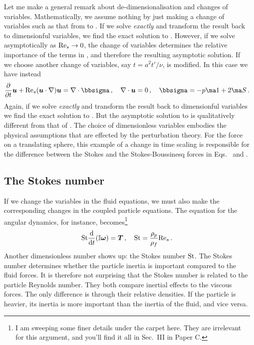 \documentclass[thesis.tex]{subfiles}
\begin{document}
Let me make a general remark about de-dimensionalisation and changes of variables. Mathematically, we assume nothing by just making a change of variables such as that from  to . If we solve  \emph{exactly} and transform the result back to dimensionful variables, we find the exact solution to . However, if we solve  asymptotically as $\textrm{Re}_s\to0$, the change of variables determines the relative importance of the terms in , and therefore the resulting asymptotic solution. If we choose another change of variables, say $t = a^2t'/\nu$,  is modified. In this case we have instead
\begin{align}
\pdiff{}{t}\ve u + \Reys(\ve u \cdot \nabla) \ve u=\nabla \cdot \bbsigma\,,\quad \nabla \cdot \ve u = 0\,,\quad \bbsigma = -p \ma 1 + 2\ma S\,.\eqnlab{nsintrodimless2}
\end{align}
Again, if we solve  \emph{exactly} and transform the result back to dimensionful variables we find the exact solution to . But the asymptotic solution to  is qualitatively different from that of . The choice of dimensionless variables embodies the physical assumptions that are effected by the perturbation theory. For the force on a translating sphere, this example of a change in time scaling is responsible for the difference between the Stokes and the Stokes-Boussinesq forces in Eqs.~ and .

\subsection{The Stokes number}\label{sec:stokesnumber}
If we change the variables in the fluid equations, we must also make the corresponding changes in the coupled particle equations. The equation for the angular dynamics, for instance, becomes\footnote{I am sweeping some finer details under the carpet here. They are irrelevant for this argument, and you'll find it all in Sec.~III in Paper C.}
\begin{align}
	\mbox{St}\frac{\mathrm{d} }{\mathrm{d} t}(\mathbb{I} \mbox{\boldmath$\omega$}) = \mbox{\boldmath$T$}\,,\quad  \mbox{St}= \frac{\rho_p}{\rho_f}\textrm{Re}_s\,.
\end{align}
Another dimensionless number shows up: the Stokes number $\mbox{St}$. The Stokes number determines whether the particle inertia is important compared to the fluid forces. It is therefore not surprising that the Stokes number is related to the particle Reynolds number. They both compare inertial effects to the viscous forces. The only difference is through their relative densities. If the particle is heavier, its inertia is more important than the inertia of the fluid, and vice versa. 
\end{document}

